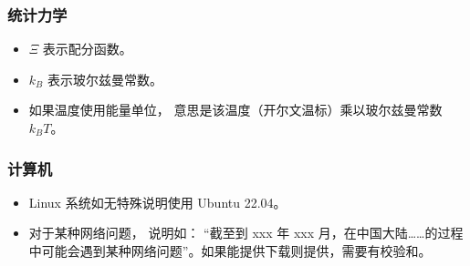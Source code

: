 \subsubsection{统计力学}
\begin{itemize}
\item $\Xi$ 表示配分函数。
\item $k_B$ 表示玻尔兹曼常数。
\item 如果温度使用能量单位， 意思是该温度（开尔文温标）乘以玻尔兹曼常数 $k_B T$。
\end{itemize}

\subsubsection{计算机}
\begin{itemize}
\item Linux 系统如无特殊说明使用 Ubuntu 22.04。
\item 对于某种网络问题， 说明如： “截至到 xxx 年 xxx 月，在中国大陆……的过程中可能会遇到某种网络问题”。如果能提供下载则提供，需要有校验和。
\end{itemize}
